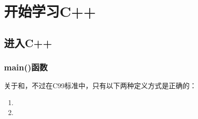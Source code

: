 
\chapter{开始学习C++}

\section{进入C++}

\subsection{main()函数}

关于和，不过在C99\cite{C99}标准中，只有以下两种定义方式是正确的：

\begin{enumerate}
\item {}
\item {}
\end{enumerate}

